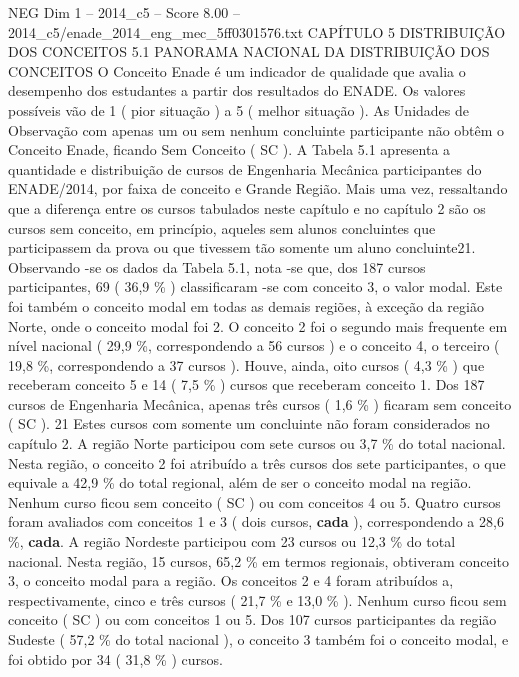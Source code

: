 \begin{textsample}{NEG Dim 1 – 2014\_c5 – Score 8.00 – 2014\_c5/enade\_2014\_eng\_mec\_5ff0301576.txt}  \label{ex:f1_neg_340}
CAPÍTULO 5 DISTRIBUIÇÃO DOS CONCEITOS 5.1 PANORAMA NACIONAL DA DISTRIBUIÇÃO DOS CONCEITOS O Conceito Enade é um indicador de qualidade que avalia o desempenho dos estudantes a partir dos resultados do ENADE.
Os valores possíveis vão de 1 ( pior situação ) a 5 ( melhor situação ).
As Unidades de Observação com apenas um ou sem nenhum concluinte participante não obtêm o Conceito Enade, ficando Sem Conceito ( SC ).
A Tabela 5.1 apresenta a quantidade e distribuição de cursos de Engenharia Mecânica participantes do ENADE/2014, por faixa de conceito e Grande Região.
Mais uma vez, ressaltando que a diferença entre os cursos tabulados neste capítulo e no capítulo 2 são os cursos sem conceito, em princípio, aqueles sem alunos concluintes que participassem da prova ou que tivessem tão somente um aluno concluinte21.
Observando -se os dados da Tabela 5.1, nota -se que, dos 187 cursos participantes, 69 ( 36,9 \% ) classificaram -se com conceito 3, o valor modal.
Este foi também o conceito modal em todas as demais regiões, à exceção da região Norte, onde o conceito modal foi 2.
O conceito 2 foi o segundo mais frequente em nível nacional ( 29,9 \%, correspondendo a 56 cursos ) e o conceito 4, o terceiro ( 19,8 \%, correspondendo a 37 cursos ).
Houve, ainda, oito cursos ( 4,3 \% ) que receberam conceito 5 e 14 ( 7,5 \% ) cursos que receberam conceito 1.
Dos 187 cursos de Engenharia Mecânica, apenas três cursos ( 1,6 \% ) ficaram sem conceito ( SC ). 21 Estes cursos com somente um concluinte não foram considerados no capítulo 2.
A região Norte participou com sete cursos ou 3,7 \% do total nacional.
Nesta região, o conceito 2 foi atribuído a três cursos dos sete participantes, o que equivale a 42,9 \% do total regional, além de ser o conceito modal na região.
Nenhum curso ficou sem conceito ( SC ) ou com conceitos 4 ou 5.
Quatro cursos foram avaliados com conceitos 1 e 3 ( dois cursos, \textbf{cada} ), correspondendo a 28,6 \%, \textbf{cada}.
A região Nordeste participou com 23 cursos ou 12,3 \% do total nacional.
Nesta região, 15 cursos, 65,2 \% em termos regionais, obtiveram conceito 3, o conceito modal para a região.
Os conceitos 2 e 4 foram atribuídos a, respectivamente, cinco e três cursos ( 21,7 \% e 13,0 \% ).
Nenhum curso ficou sem conceito ( SC ) ou com conceitos 1 ou 5.
Dos 107 cursos participantes da região Sudeste ( 57,2 \% do total nacional ), o conceito 3 também foi o conceito modal, e foi obtido por 34 ( 31,8 \% ) cursos.

\end{textsample}
